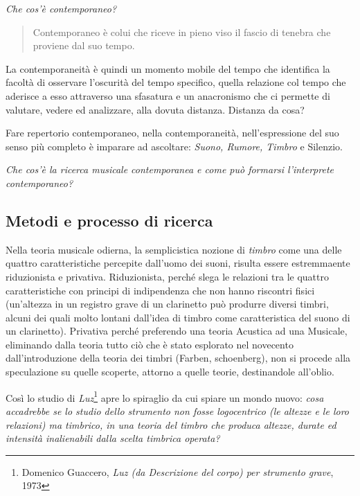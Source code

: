 \documentclass{gs-adonis}
\begin{document}
\emph{Che cos'è contemporaneo?}

\begin{quote}
  Contemporaneo è colui che riceve in pieno viso il fascio di tenebra che proviene dal suo tempo. \cite{agamben2008che}
\end{quote}

La contemporaneità è quindi un momento mobile del tempo che identifica la
facoltà di osservare l’oscurità del tempo specifico, quella relazione col
tempo che aderisce a esso attraverso una sfasatura e un anacronismo che ci
permette di valutare, vedere ed analizzare, alla dovuta distanza. Distanza da
cosa?

Fare repertorio contemporaneo, nella contemporaneità, nell’espressione del suo
senso più completo è imparare ad ascoltare: \emph{Suono, Rumore, Timbro} e Silenzio.

\emph{Che cos'è la ricerca musicale contemporanea e come può formarsi l'interprete contemporaneo?}
\subsection{Metodi e processo di ricerca}%

Nella teoria musicale odierna, la semplicistica nozione di \emph{timbro} come
una delle quattro caratteristiche percepite dall'uomo dei suoni, risulta essere
estremmaente riduzionista e privativa. Riduzionista, perché slega le relazioni
tra le quattro caratteristiche con principi di indipendenza che non hanno
riscontri fisici (un'altezza in un registro grave di un clarinetto può produrre
diversi timbri, alcuni dei quali molto lontani dall'idea di timbro come
caratteristica del suono di un clarinetto). Privativa perché preferendo una
teoria Acustica ad una Musicale, eliminando dalla teoria tutto ciò che è stato
esplorato nel novecento dall'introduzione della teoria dei timbri (Farben, schoenberg),
non si procede alla speculazione su quelle scoperte, attorno a quelle teorie,
destinandole all'oblio.

Così lo studio di \emph{Luz}\footnote{%
Domenico Guaccero, \emph{Luz (da Descrizione del corpo) per strumento grave}, 1973
} apre lo spiraglio da cui spiare un mondo nuovo: \emph{cosa accadrebbe se lo
studio dello strumento non fosse logocentrico (le altezze e le loro relazioni)
ma timbrico, in una teoria del timbro che produca altezze, durate ed intensità
inalienabili dalla scelta timbrica operata?}
\end{document}
